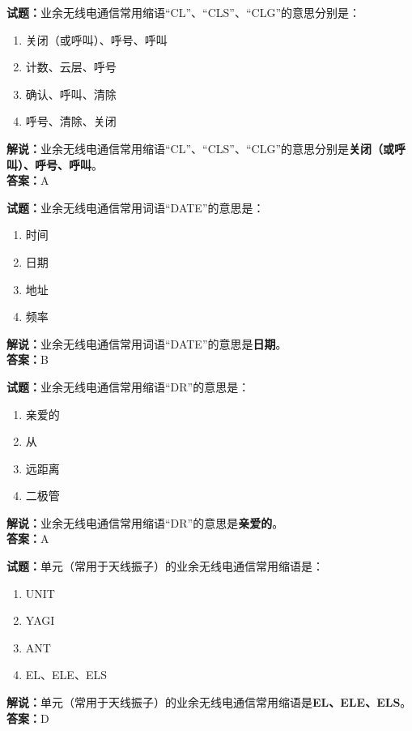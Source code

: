 \documentclass{ctexbook}
\begin{document}
\vspace{1em}

\textbf{试题：}业余无线电通信常用缩语“CL”、“CLS”、“CLG”的意思分别是：
\begin{enumerate}[leftmargin=3em]
  \item 关闭（或呼叫）、呼号、呼叫
  \item 计数、云层、呼号
  \item 确认、呼叫、清除
  \item 呼号、清除、关闭
\end{enumerate}
\noindent\textbf{解说：}业余无线电通信常用缩语“CL”、“CLS”、“CLG”的意思分别是\textbf{关闭（或呼叫）、呼号、呼叫}。\\\noindent\textbf{答案：}A

\vspace{1em}

\textbf{试题：}业余无线电通信常用词语“DATE”的意思是：
\begin{enumerate}[leftmargin=3em]
  \item 时间
  \item 日期
  \item 地址
  \item 频率
\end{enumerate}
\noindent\textbf{解说：}业余无线电通信常用词语“DATE”的意思是\textbf{日期}。\\\noindent\textbf{答案：}B

\vspace{1em}

\textbf{试题：}业余无线电通信常用缩语“DR”的意思是：
\begin{enumerate}[leftmargin=3em]
  \item 亲爱的
  \item 从
  \item 远距离
  \item 二极管
\end{enumerate}
\noindent\textbf{解说：}业余无线电通信常用缩语“DR”的意思是\textbf{亲爱的}。\\\noindent\textbf{答案：}A

\vspace{1em}

\textbf{试题：}单元（常用于天线振子）的业余无线电通信常用缩语是：
\begin{enumerate}[leftmargin=3em]
  \item UNIT
  \item YAGI
  \item ANT
  \item EL、ELE、ELS
\end{enumerate}
\noindent\textbf{解说：}单元（常用于天线振子）的业余无线电通信常用缩语是\textbf{EL、ELE、ELS}。\\\noindent\textbf{答案：}D
\end{document}
